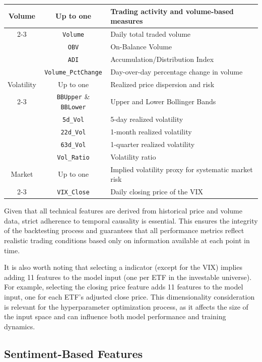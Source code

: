 \begin{table}[H]
\begin{tabular}{|c|c|p{9cm}|}
Volume & Up to one & Trading activity and volume-based measures \\
\cline{2-3}
 & \texttt{Volume} & Daily total traded volume \\
 & \texttt{OBV} & On-Balance Volume \\
 & \texttt{ADI} & Accumulation/Distribution Index \\
 & \texttt{Volume\_PctChange} & Day-over-day percentage change in volume \\
\hline

Volatility & Up to one & Realized price dispersion and risk \\
\cline{2-3}
 & \texttt{BBUpper} \& \texttt{BBLower} & Upper and Lower Bollinger Bands \\
 & \texttt{5d\_Vol} & 5-day realized volatility \\
 & \texttt{22d\_Vol} & 1-month realized volatility \\
 & \texttt{63d\_Vol} & 1-quarter realized volatility \\
 & \texttt{Vol\_Ratio} & Volatility ratio \\
\hline

Market & Up to one & Implied volatility proxy for systematic market risk \\
\cline{2-3}
 & \texttt{VIX\_Close} & Daily closing price of the VIX \\
\hline

\end{tabular}
\end{table}

Given that all technical features are derived from historical price and volume data, strict adherence to temporal causality is essential. This ensures the integrity of the backtesting process and guarantees that all performance metrics reflect realistic trading conditions based only on information available at each point in time.

It is also worth noting that selecting a indicator (except for the VIX) implies adding 11 features to the model input (one per ETF in the investable universe). For example, selecting the closing price feature adds 11 features to the model input, one for each ETF's adjusted close price. This dimensionality consideration is relevant for the hyperparameter optimization process, as it affects the size of the input space and can influence both model performance and training dynamics.

\subsection{Sentiment-Based Features}

